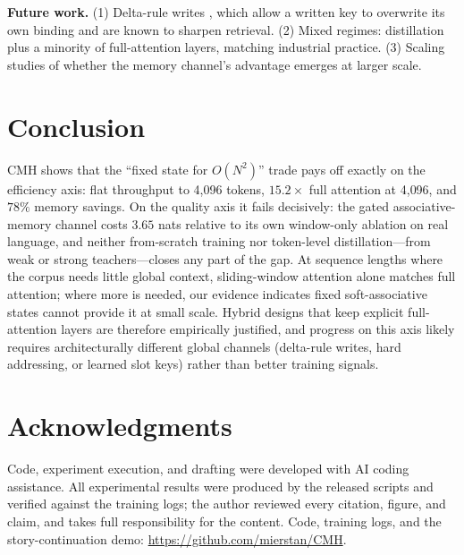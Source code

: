\documentclass[11pt]{article}
\newcommand{\cmh}{CMH}
\begin{document}
\textbf{Future work.} (1) Delta-rule writes \cite{yang2023delta}, which allow a written
key to overwrite its own binding and are known to sharpen retrieval. (2) Mixed regimes:
distillation plus a minority of full-attention layers, matching industrial practice.
(3) Scaling studies of whether the memory channel's advantage emerges at larger scale.

\section{Conclusion}

\cmh{} shows that the ``fixed state for $O(N^2)$'' trade pays off exactly on the
efficiency axis: flat throughput to 4{,}096 tokens, $15.2\times$ full attention at
4{,}096, and $78\%$ memory savings. On the quality axis it fails decisively: the gated
associative-memory channel costs $3.65$ nats relative to its own window-only ablation on
real language, and neither from-scratch training nor token-level distillation---from
weak or strong teachers---closes any part of the gap. At sequence lengths where the
corpus needs little global context, sliding-window attention alone matches full
attention; where more is needed, our evidence indicates fixed soft-associative states
cannot provide it at small scale. Hybrid designs that keep explicit full-attention
layers are therefore empirically justified, and progress on this axis likely requires
architecturally different global channels (delta-rule writes, hard addressing, or
learned slot keys) rather than better training signals.

\section*{Acknowledgments}

Code, experiment execution, and drafting were developed with AI coding assistance. All
experimental results were produced by the released scripts and verified against the
training logs; the author reviewed every citation, figure, and claim, and takes full
responsibility for the content. Code, training logs, and the story-continuation demo:
\url{https://github.com/mierstan/CMH}.
\end{document}
